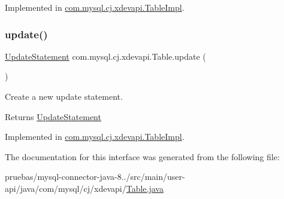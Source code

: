 Implemented in \mbox{\hyperlink{classcom_1_1mysql_1_1cj_1_1xdevapi_1_1_table_impl_a048429d90cca804cd60ce9a49f5b12fd}{com.\+mysql.\+cj.\+xdevapi.\+Table\+Impl}}.

\mbox{\label{interfacecom_1_1mysql_1_1cj_1_1xdevapi_1_1_table_a941215cefeb7236388db7d0390621a17}} 
\subsubsection{\texorpdfstring{update()}{update()}}
{\footnotesize\ttfamily \mbox{\hyperlink{interfacecom_1_1mysql_1_1cj_1_1xdevapi_1_1_update_statement}{Update\+Statement}} com.\+mysql.\+cj.\+xdevapi.\+Table.\+update (\begin{DoxyParamCaption}{ }\end{DoxyParamCaption})}

Create a new update statement.

\begin{DoxyReturn}{Returns}
\mbox{\hyperlink{interfacecom_1_1mysql_1_1cj_1_1xdevapi_1_1_update_statement}{Update\+Statement}} 
\end{DoxyReturn}


Implemented in \mbox{\hyperlink{classcom_1_1mysql_1_1cj_1_1xdevapi_1_1_table_impl_a4f6da4761f5ff7becb0737c11b0ea0db}{com.\+mysql.\+cj.\+xdevapi.\+Table\+Impl}}.



The documentation for this interface was generated from the following file\+:\begin{DoxyCompactItemize}
\item 
pruebas/mysql-\/connector-\/java-\/8../src/main/user-\/api/java/com/mysql/cj/xdevapi/\mbox{\hyperlink{_table_8java}{Table.\+java}}\end{DoxyCompactItemize}
